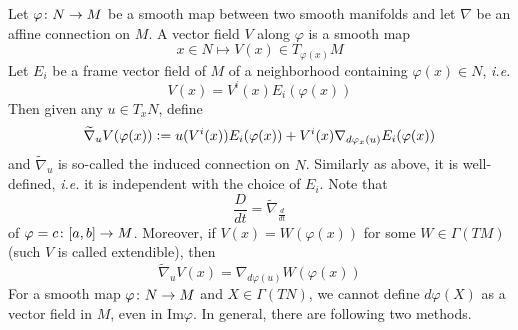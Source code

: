 \noindent Let $\varphi \colon N \rightarrow M$ be a smooth map between two smooth manifolds and let $\nabla$ be an affine connection on $M$. A vector field $V$ along $\varphi$ is a smooth map
\begin{equation*}
	x \in N \mapsto V(x) \in T_{\varphi(x)}M
\end{equation*}
Let $E_i$ be a frame vector field of $M$ of a neighborhood containing $\varphi(x) \in N$, \emph{i.e.}
\begin{equation*}
	V(x) = V^i(x)E_i(\varphi(x))
\end{equation*}
Then given any $u \in T_xN$, define
\begin{equation*}
	\widetilde{\nabla}_uV(\varphi(x)) \vcentcolon= u(V^i(x))E_i(\varphi(x)) + V^i(x)\nabla_{d\varphi_x(u)}E_i(\varphi(x))
\end{equation*}
and $\widetilde{\nabla}_u$ is so-called the induced connection on $N$. Similarly as above, it is well-defined, \emph{i.e.} it is independent with the choice of $E_i$. Note that
\begin{equation*}
	\frac{D}{dt} = \widetilde{\nabla}_{\frac{d}{dt}}
\end{equation*}
of $\varphi = c \colon [a,b] \rightarrow M$. Moreover, if $V(x) = W(\varphi(x))$ for some $W \in \Gamma(TM)$ (such $V$ is called extendible), then
\begin{equation*}
	\widetilde{\nabla}_uV(x) = \nabla_{d\varphi(u)} W(\varphi(x))
\end{equation*}
\noindent For a smooth map $\varphi \colon N \rightarrow M$ and $X \in \Gamma(TN)$, we cannot define $d\varphi(X)$ as a vector field in $M$, even in $\text{Im}\varphi$. In general, there are following two methods.
